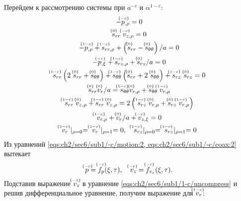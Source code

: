 Перейдем к рассмотрению системы при $a^{-c}$ и $\alpha^{1-c}$:
\begin{subequations}
  \label{eqs:ch2/sec6/sub1/main/float}
  \begin{gather}
    \label{eqs:ch2/sec6/sub1/-c/motion:2}
    -\uindex{p}{-c}_{,\rho} = 0
    \\
    \label{eqs:ch2/sec6/sub1/-c/coax:2}
    \uindex{s}{0}_{rr} \; \uindex{v}{-c}_{z,\rho} = 0
    \\
    \label{eqs:ch2/sec6/sub1/1-c/motion:1}
    -\uindex{p}{1-c}_{,\rho}+\uindex{s}{1-c}_{rr,\rho} +\left(\uindex{s}{0}_{rr}-\uindex{s}{0}_{\theta\theta}\right) / a = 0
    \\
    \label{eqs:ch2/sec6/sub1/1-c/motion:2}
    -\uindex{p}{-c}_{,\xi} + \uindex{s}{1-c}_{rz,\rho} + \uindex{s}{0}_{rz} / a = 0
    \\
    \label{eqs:ch2/sec6/sub1/1-c/plasticity}
    \uindex{s}{1-c}_{rr} \left(2 \ \uindex{s}{0}_{rr} + \uindex{s}{0}_{\theta\theta}\right) + 
      \uindex{s}{1-c}_{\theta\theta} \left(\uindex{s}{0}_{rr} + 2 \ \uindex{s}{0}_{\theta\theta}\right) + 
        \uindex{s}{1-c}_{rz} \ \uindex{s}{0}_{rz} = 0
    \\
    \label{eqs:ch2/sec6/sub1/1-c/coax:1}
    \uindex{s}{0}_{rr} \uindex{v}{0}_{r} / a = \uindex{s}{1-c}_{\theta\theta} \uindex{v}{0}_{r,\rho} + \uindex{s}{0}_{\theta\theta} \; \uindex{v}{1-c}_{r,\rho}
    \\
    \label{eqs:ch2/sec6/sub1/1-c/coax:2}
    \uindex{s}{1-c}_{rr} \; \uindex{v}{0}_{z,\rho} + \uindex{s}{1-c}_{rr} \; \uindex{v}{0}_{z,\rho} =
      2 \left(\; \uindex{s}{1-c}_{rz} \; \uindex{v}{0}_{r,\rho} + \uindex{s}{0}_{rz} \; \uindex{v}{1-c}_{r,\rho} \right)
    \\
    \label{eqs:ch2/sec6/sub1/1-c/uncompress}
    \uindex{v}{1-c}_{r,\rho} + \uindex{v}{0}_{r} / a + \uindex{v}{-c}_{z,\xi} = 0
    \\
    \label{eq:ch2/sec6/sub1/boundary/1-c}
    \uindex{v}{1-c}_{r} \ \lvert_{\rho=0} =\; \uindex{v}{1-c}_{r}\ \lvert_{\rho=1} = 0, \quad  \uindex{s}{1-c}_{rz}\lvert_{\rho=0} =\; \uindex{s}{1-c}_{rz}\lvert_{\rho=1} = 0
  \end{gather}
\end{subequations}
Из уравнений \cref{eqs:ch2/sec6/sub1/-c/motion:2, eqs:ch2/sec6/sub1/-c/coax:2} вытекает
\begin{equation*}
  \uindex{p}{-c} = \uindex{f}{-c}_{p}(\xi, \tau), \quad \uindex{v}{-c}_{z} = \uindex{f}{-c}_{v_{z}}(\xi, \tau).
\end{equation*}
Подставив выражение $\uindex{v}{-1}_{z}$ в уравнение \cref{eqs:ch2/sec6/sub1/1-c/uncompress} и решив дифференциальное уравнение, получим выражение для $\uindex{v}{1-c}_{r}$:
